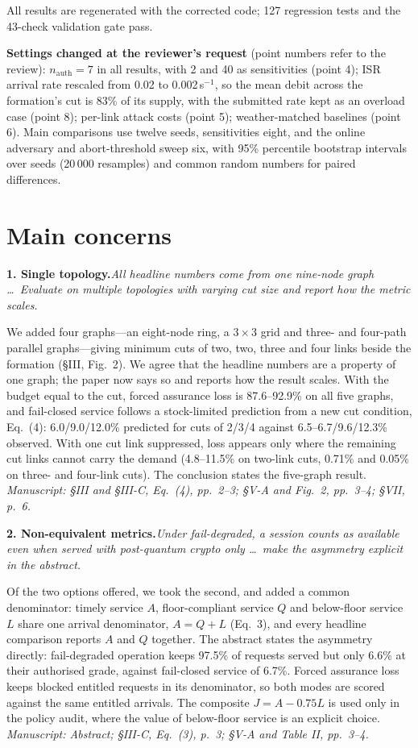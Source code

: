 \documentclass[10pt,a4paper]{article}
\newcommand{\loc}[1]{\textit{Manuscript: #1.}}
\newcommand{\comment}[2]{\par\medskip\noindent\textbf{#1}\hspace{0.4em}\textit{#2}\par}
\begin{document}
All results are regenerated with the corrected code; 127 regression tests and the
43-check validation gate pass.

\textbf{Settings changed at the reviewer's request} (point numbers refer to the
review): $n_{\mathrm{auth}}=7$ in all results, with 2 and 40 as sensitivities
(point 4); ISR arrival rate rescaled from 0.02 to 0.002\,s$^{-1}$, so the mean debit
across the formation's cut is 83\% of its supply, with the submitted rate kept as an
overload case (point 8); per-link attack costs (point 5); weather-matched baselines
(point 6). Main comparisons use twelve seeds, sensitivities eight, and the online
adversary and abort-threshold sweep six, with 95\% percentile bootstrap intervals
over seeds (20\,000 resamples) and common random numbers for paired differences.

\section*{Main concerns}

\comment{1. Single topology.}{All headline numbers come from one nine-node graph \ldots\ Evaluate on multiple topologies with varying cut size and report how the metric scales.}
We added four graphs---an eight-node ring, a $3\times3$ grid and three- and
four-path parallel graphs---giving minimum cuts of two, two, three and four links
beside the formation (\S III, Fig.~2). We agree that the headline numbers are a
property of one graph; the paper now says so and reports how the result scales.
With the budget equal to the cut, forced assurance loss is 87.6--92.9\% on all five
graphs, and fail-closed service follows a stock-limited prediction from a new cut
condition, Eq.~(4): 6.0/9.0/12.0\% predicted for cuts of 2/3/4 against
6.5--6.7/9.6/12.3\% observed. With one cut link suppressed, loss appears only where
the remaining cut links cannot carry the demand (4.8--11.5\% on two-link cuts, 0.71\%
and 0.05\% on three- and four-link cuts). The conclusion states the five-graph result.
\loc{\S III and \S III-C, Eq.~(4), pp.~2--3; \S V-A and Fig.~2, pp.~3--4; \S VII, p.~6}

\comment{2. Non-equivalent metrics.}{Under fail-degraded, a session counts as available even when served with post-quantum crypto only \ldots\ make the asymmetry explicit in the abstract.}
Of the two options offered, we took the second, and added a common denominator: timely service $A$, floor-compliant
service $Q$ and below-floor service $L$ share one arrival denominator, $A=Q+L$
(Eq.~3), and every headline comparison reports $A$ and $Q$ together. The abstract
states the asymmetry directly: fail-degraded operation keeps 97.5\% of requests
served but only 6.6\% at their authorised grade, against fail-closed service of
6.7\%. Forced assurance loss keeps blocked entitled requests in its denominator, so
both modes are scored against the same entitled arrivals. The composite
$J=A-0.75L$ is used only in the policy audit, where the value of below-floor service
is an explicit choice.
\loc{Abstract; \S III-C, Eq.~(3), p.~3; \S V-A and Table II, pp.~3--4}
\end{document}
